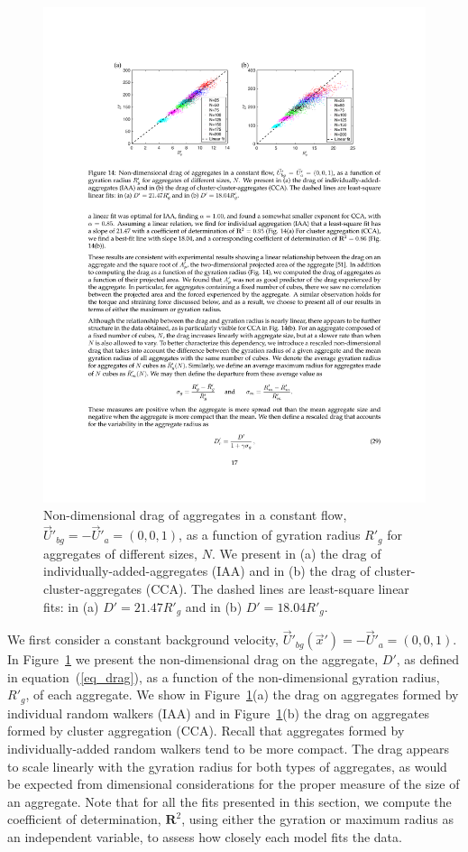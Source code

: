 \begin{figure}[ht]
	\begin{center}
		\includegraphics[scale = 1.0]{./figures/fig_drag_allprime.pdf}
	\end{center}
	\caption{Non-dimensional drag of aggregates in a constant flow, $\vec{U}'_{bg} = -\vec{U}'_a = (0,0,1)$, as a function of gyration radius $R'_g$ for aggregates of different sizes, $N$. We present in (a) the drag of individually-added-aggregates (IAA) and in (b) the drag of cluster-cluster-aggregates (CCA). The dashed lines are least-square linear fits: in (a) $D' = 21.47 R'_g$ and in (b) $D' =18.04 R'_g$.}
	\label{fig_drag_raw}
\end{figure}

We first consider a constant background velocity, $\vec{U}'_{bg}(\vec{x}') = -\vec{U}'_a=(0,0,1)$. In Figure~\ref{fig_drag_raw} we present the non-dimensional drag on the aggregate, $D'$, as defined in equation~(\ref{eq_drag}),
 as a function of the non-dimensional gyration radius, $R'_g$, of each aggregate. We show in Figure~\ref{fig_drag_raw}(a) the drag on aggregates formed by individual random walkers (IAA) and in Figure~\ref{fig_drag_raw}(b) the drag on aggregates formed by cluster aggregation (CCA).
 Recall that aggregates formed by individually-added random walkers tend to be more compact.
The drag appears to scale linearly with the gyration radius for both types of aggregates, as would be expected from dimensional considerations for the proper measure of the size of an aggregate. 
Note that for all the fits presented in this section, we compute the coefficient of determination, $\mathbf{R}^2$, using either the gyration or maximum radius as an independent variable, to assess how closely each model fits the data. 

